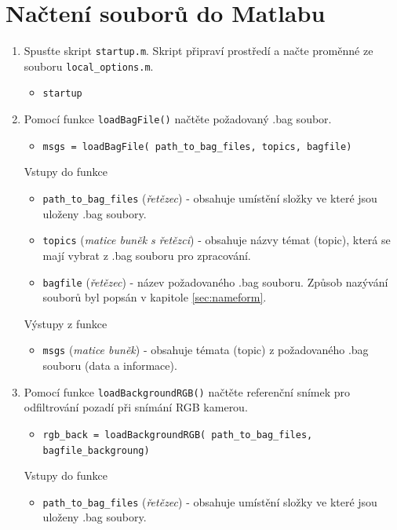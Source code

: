 \documentclass[10pt,a4paper,titlepage,oneside]{report}
\begin{document}
\section{Načtení souborů do Matlabu}
\label{sec:loadBag}
\begin{enumerate}
  \item Spusťte skript \verb|startup.m|. Skript připraví prostředí a načte proměnné ze souboru \verb|local_options.m|.
    \begin{itemize}
  	\item \verb|startup|
  \end{itemize}
  \item Pomocí funkce \verb|loadBagFile()| načtěte požadovaný .bag soubor.
	\label{itm:load1}    
    \begin{itemize}
  	\item \verb|msgs = loadBagFile( path_to_bag_files, topics, bagfile)|
    \end{itemize}
    		Vstupy do funkce
        		\begin{itemize}
  			\item \verb|path_to_bag_files| (\textit{řetězec}) - obsahuje umístění složky ve které jsou uloženy .bag soubory.
  			\item \verb|topics| (\textit{matice buněk s řetězci}) - obsahuje názvy témat (topic), která se mají vybrat z .bag souboru pro zpracování.
  			\item \verb|bagfile| (\textit{řetězec}) - název požadovaného .bag souboru. Způsob nazývání souborů byl popsán v kapitole \ref{sec:nameform}.
    			\end{itemize}
    		Výstupy z funkce
        		\begin{itemize}
  			\item \verb|msgs| (\textit{matice buněk}) - obsahuje témata (topic) z požadovaného .bag souboru (data a informace).
    			\end{itemize}
    \item Pomocí funkce \verb|loadBackgroundRGB()| načtěte referenční snímek pro odfiltrování pozadí při snímání RGB kamerou.
	\label{itm:load2} 
    \begin{itemize}
  	\item \verb|rgb_back = loadBackgroundRGB( path_to_bag_files, bagfile_backgroung)|
    \end{itemize}
    		Vstupy do funkce
        		\begin{itemize}
  			\item \verb|path_to_bag_files| (\textit{řetězec}) - obsahuje umístění složky ve které jsou uloženy .bag soubory.

\end{itemize}
\end{enumerate}
\end{document}
